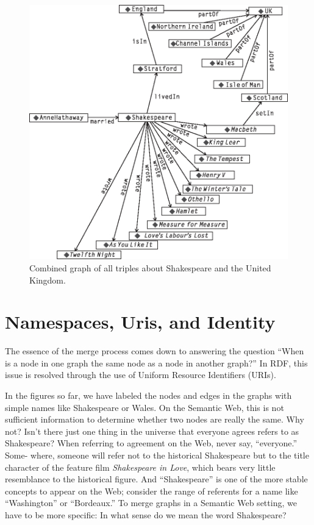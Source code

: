 \begin{figure}
    \centering
    \includegraphics[width=5.0in]{media/f03-06-9780123859655.eps}
    \caption{Combined graph of all triples about Shakespeare and the United Kingdom.}
    \label{fig:ch3.6}
\end{figure}



\section{Namespaces, Uris, and Identity}

The essence of the merge process comes down to answering the question ``When is
a node in one graph the same node as a node in another graph?'' In RDF,
this issue is resolved through the use of Uniform Resource Identifiers
(URIs).

In the figures so far, we have labeled the nodes and edges in the graphs
with simple names like Shakespeare or Wales. On the Semantic Web, this
is not sufficient information to determine whether two nodes are really
the same. Why not? Isn't there just one thing in the universe that
everyone agrees refers to as Shakespeare? When referring to agreement on
the Web, never say, ``everyone.'' Some- where, someone will refer not to
the historical Shakespeare but to the title character of the feature
film \emph{Shakespeare in Love}, which bears very little resemblance to
the historical figure. And ``Shakespeare'' is one of the more stable
concepts to appear on the Web; consider the range of referents for a
name like ``Washington'' or ``Bordeaux.'' To merge graphs in a Semantic
Web setting, we have to be more specific: In what sense do we mean the
word Shakespeare?

